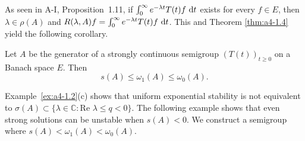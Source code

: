 As seen in A-I, Proposition~1.11, if $\int_0^\infty e^{-\lambda t} T(t) f \,\mathop{}\!\mathrm{d}{t}$ exists for every $f \in E$, then $\lambda \in \rho(A)$ and $R(\lambda, A) f = \int_0^\infty e^{-\lambda t} T(t) f \,\mathop{}\!\mathrm{d}{t}$. 
This and Theorem \ref{thm:a4-1.4} yield the following corollary.
\begin{corollary} \label{cor:a4-1.5} Let $ A $ be the generator of a strongly continuous semigroup $ (T(t))_{t \geq 0} $ on a Banach space $ E $. 
Then  
\[
s(A) \leq \omega_1(A) \leq \omega_0(A).
\]
\end{corollary}


 Example~\ref{ex:a4-1.2}(c) shows that uniform exponential stability is not equivalent to $ \sigma(A) \subset \{\lambda \in \mathbb{C}\colon\text{Re } \lambda \leq q < 0 \} $. 
The following example shows that even strong solutions can be unstable when $ s(A) < 0 $. We construct a semigroup where $ s(A) < \omega_1(A) < \omega_0(A) $.

